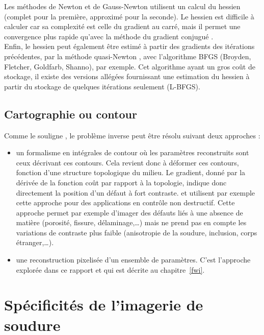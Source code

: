 Les méthodes de Newton et de Gauss-Newton utilisent un calcul du hessien (complet pour la première, approximé pour la seconde). Le hessien est difficile à calculer car sa complexité est celle du gradient au carré, mais il permet une convergence plus rapide qu'avec la méthode du gradient conjugué \citep{pratt_98}.\\

Enfin, le hessien peut également être estimé à partir des gradients des itérations précédentes, par la méthode quasi-Newton \citep{nocedal}, avec l'algorithme BFGS (Broyden, Fletcher, Goldfarb, Shanno), par exemple. Cet algorithme ayant un gros coût de stockage, il existe des versions allégées fournissant une estimation du hessien à partir du stockage de quelques itérations seulement (L-BFGS). 
\subsection{Cartographie ou contour}
Comme le souligne \cite{mat_ac}, le problème inverse peut être résolu suivant deux approches : 
\begin{itemize}
	\item un formalisme en intégrales de contour où les paramètres reconstruits sont ceux décrivant ces contours. Cela revient donc à déformer ces contours, fonction d'une structure topologique du milieu. Le gradient, donné par la dérivée de la fonction coût par rapport à la topologie, indique donc directement la position d'un défaut à fort contraste. \cite{dominguez} et \cite{rodriguez} utilisent par exemple cette approche pour des applications en contrôle non destructif. Cette approche permet par exemple d'imager des défauts liés à une absence de matière (porosité, fissure, délaminage,\ldots) mais ne prend pas en compte les variations de contraste plus faible (anisotropie de la soudure, inclusion, corps étranger,\ldots).
	\item une reconstruction pixelisée d'un ensemble de paramètres. C'est l'approche explorée dans ce rapport et qui est décrite au chapitre~\ref{fwi}.
\end{itemize}




\section{Spécificités de l'imagerie de soudure}

